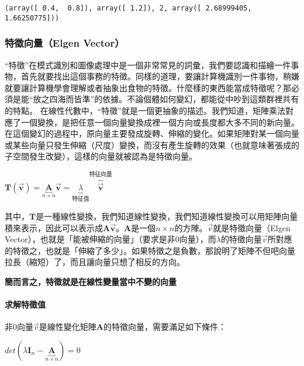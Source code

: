 \documentclass[11pt]{article}
\begin{document}
{    \begin{Verbatim}[commandchars=\\\{\}]
(array([ 0.4,  0.8]), array([ 1.2]), 2, array([ 2.68999405,  1.66250775]))

    \end{Verbatim}

    \hypertarget{ux7279ux5fb5ux5411ux91cfelgen-vector}{%
\subsubsection{特徵向量（Elgen
Vector）}\label{ux7279ux5fb5ux5411ux91cfelgen-vector}}

``特徵''在模式識別和圖像處理中是一個非常常見的詞彙，我們要認識和描繪一件事物，首先就要找出這個事務的特徵。同樣的道理，要讓計算機識別一件事物，稍嫌就要讓計算機學會理解或者抽象出食物的特徵。什麼樣的東西能當成特徵呢？那必須是能``放之四海而皆準''的依據。不論個體如何變幻，都能從中吵到這類群裡共有的特點。
在線性代數中，``特徵''就是一個更抽象的描述。我們知道，矩陣乘法對應了一個變換，是把任意一個向量變換成裡一個方向或長度都大多不同的新向量。在這個變幻的過程中，原向量主要發成旋轉、伸縮的變化。如果矩陣對某一個向量或某些向量只發生伸縮（尺度）變換，而沒有產生旋轉的效果（也就意味著張成的子空間發生改變），這樣的向量就被認為是特徵向量。

\(\mathbf{T}(\vec{\mathbf{v}}) = \underbrace{\mathbf{A}}_{n\times n}\vec{\mathbf{v}} = \underbrace{\lambda}_{特征值} \overbrace{\vec{\mathbf{v}}}^{特征向量}\)

其中，\(\mathbf{T}\)是一種線性變換，我們知道線性變換，我們知道線性變換可以用矩陣向量積來表示，因此可以表示成\(\mathbf{A \vec{v}}\)。\(\mathbf{A}\)是一個\(n \times n\)的方陣。\(\vec{v}\)就是特徵向量（Elgen
Vector），也就是「能被伸縮的向量」（要求是非\(0\)向量），而\(\lambda\)的特徵向量\(\vec{v}\)所對應的特徵之，也就是「伸縮了多少」。如果特徵之是負數，那說明了矩陣不但吧向量拉長（縮短）了，而且讓向量只想了相反的方向。

    \textbf{簡而言之，特徵就是在線性變量當中不變的向量}

    \hypertarget{ux6c42ux89e3ux7279ux5fb5ux503c}{%
\paragraph{求解特徵值}\label{ux6c42ux89e3ux7279ux5fb5ux503c}}

非\(0\)向量\(\vec{v}\)是線性變化矩陣\(\mathbf{A}\)的特徵向量，需要滿足如下條件：

\(det(\lambda \mathbf{I}_n - \underbrace{\mathbf{A}}_{n\times n}) = 0\)

}
\end{document}
